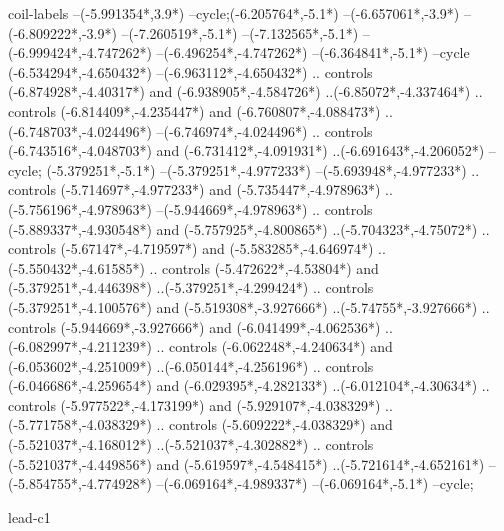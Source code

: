 {\begin{scope}[x=1mm,y=1mm,line width=\SCstroke mm,line cap=round,line join=round]
\begin{SCpart}{coil-labels}
--({-5.991354*\SCF},{3.9*\SCF})
--cycle; ({-6.205764*\SCF},{-5.1*\SCF})
--({-6.657061*\SCF},{-3.9*\SCF})
--({-6.809222*\SCF},{-3.9*\SCF})
--({-7.260519*\SCF},{-5.1*\SCF})
--({-7.132565*\SCF},{-5.1*\SCF})
--({-6.999424*\SCF},{-4.747262*\SCF})
--({-6.496254*\SCF},{-4.747262*\SCF})
--({-6.364841*\SCF},{-5.1*\SCF})
--cycle
({-6.534294*\SCF},{-4.650432*\SCF})
--({-6.963112*\SCF},{-4.650432*\SCF})
.. controls ({-6.874928*\SCF},{-4.40317*\SCF}) and ({-6.938905*\SCF},{-4.584726*\SCF}) ..({-6.85072*\SCF},{-4.337464*\SCF})
.. controls ({-6.814409*\SCF},{-4.235447*\SCF}) and ({-6.760807*\SCF},{-4.088473*\SCF}) ..({-6.748703*\SCF},{-4.024496*\SCF})
--({-6.746974*\SCF},{-4.024496*\SCF})
.. controls ({-6.743516*\SCF},{-4.048703*\SCF}) and ({-6.731412*\SCF},{-4.091931*\SCF}) ..({-6.691643*\SCF},{-4.206052*\SCF})
--cycle;
 ({-5.379251*\SCF},{-5.1*\SCF})
--({-5.379251*\SCF},{-4.977233*\SCF})
--({-5.693948*\SCF},{-4.977233*\SCF})
.. controls ({-5.714697*\SCF},{-4.977233*\SCF}) and ({-5.735447*\SCF},{-4.978963*\SCF}) ..({-5.756196*\SCF},{-4.978963*\SCF})
--({-5.944669*\SCF},{-4.978963*\SCF})
.. controls ({-5.889337*\SCF},{-4.930548*\SCF}) and ({-5.757925*\SCF},{-4.800865*\SCF}) ..({-5.704323*\SCF},{-4.75072*\SCF})
.. controls ({-5.67147*\SCF},{-4.719597*\SCF}) and ({-5.583285*\SCF},{-4.646974*\SCF}) ..({-5.550432*\SCF},{-4.61585*\SCF})
.. controls ({-5.472622*\SCF},{-4.53804*\SCF}) and ({-5.379251*\SCF},{-4.446398*\SCF}) ..({-5.379251*\SCF},{-4.299424*\SCF})
.. controls ({-5.379251*\SCF},{-4.100576*\SCF}) and ({-5.519308*\SCF},{-3.927666*\SCF}) ..({-5.74755*\SCF},{-3.927666*\SCF})
.. controls ({-5.944669*\SCF},{-3.927666*\SCF}) and ({-6.041499*\SCF},{-4.062536*\SCF}) ..({-6.082997*\SCF},{-4.211239*\SCF})
.. controls ({-6.062248*\SCF},{-4.240634*\SCF}) and ({-6.053602*\SCF},{-4.251009*\SCF}) ..({-6.050144*\SCF},{-4.256196*\SCF})
.. controls ({-6.046686*\SCF},{-4.259654*\SCF}) and ({-6.029395*\SCF},{-4.282133*\SCF}) ..({-6.012104*\SCF},{-4.30634*\SCF})
.. controls ({-5.977522*\SCF},{-4.173199*\SCF}) and ({-5.929107*\SCF},{-4.038329*\SCF}) ..({-5.771758*\SCF},{-4.038329*\SCF})
.. controls ({-5.609222*\SCF},{-4.038329*\SCF}) and ({-5.521037*\SCF},{-4.168012*\SCF}) ..({-5.521037*\SCF},{-4.302882*\SCF})
.. controls ({-5.521037*\SCF},{-4.449856*\SCF}) and ({-5.619597*\SCF},{-4.548415*\SCF}) ..({-5.721614*\SCF},{-4.652161*\SCF})
--({-5.854755*\SCF},{-4.774928*\SCF})
--({-6.069164*\SCF},{-4.989337*\SCF})
--({-6.069164*\SCF},{-5.1*\SCF})
--cycle;
\end{SCpart}
\begin{SCpart}{lead-c1}

\end{SCpart}
\end{scope}}
